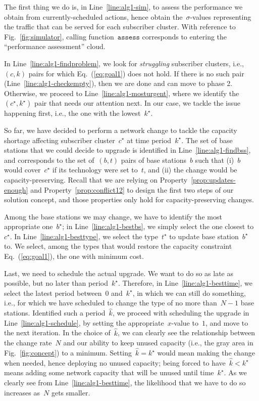 \documentclass[10pt,journal,cspaper,compsoc]{IEEEtran}
\newcommand{\Fig}[1]{Fig.~\ref{fig:#1}}
\newcommand{\Eq}[1]{Eq.~(\ref{eq:#1})}
\newcommand{\Line}[1]{Line~\ref{line:#1}}
\newcommand{\Prop}[1]{Property~\ref{prop:#1}}
\begin{document}
The first thing we do is, in \Line{alg1-sim}, to assess the performance we obtain from
currently-scheduled actions, hence obtain the~$\sigma$-values
representing the traffic that can be served for each subscriber cluster.
With reference to \Fig{simulator}, calling function~$\texttt{assess}$
corresponds to entering the ``performance assessment'' cloud.

In \Line{alg1-findproblem}, we look for {\em struggling} subscriber clusters, i.e.,~$(c,k)$ pairs
for which \Eq{goal1} does not hold. If there is no such pair
(\Line{alg1-checkempty}), then we are done and can move to phase 2. Otherwise, we proceed to \Line{alg1-mosturgent}, where we
identify the~$(c^\star,k^\star)$ pair that needs our attention next. In our case, we tackle the issue happening first, i.e., the one
with the lowest~$k^\star$.

So far, we have decided to perform a network change to tackle the capacity shortage affecting subscriber cluster~$c^\star$
at time period~$k^\star$. The set of base stations that we could decide to upgrade is identified in \Line{alg1-findbss},
and corresponds to the set of~$(b,t)$ pairs of base stations~$b$ such that
(i)~$b$ would cover~$c^\star$ if its technology were set to~$t$, and (ii) the change would be capacity-preserving.
Recall that we are relying on \Prop{updates-enough} and \Prop{conflict12} to design the first two steps of our solution concept,
and those properties only hold for capacity-preserving changes.

Among the base stations we may change, we have to identify the most appropriate one~$b^\star$; in
\Line{alg1-bestbs}, we simply select the one closest to~$c^\star$.
In \Line{alg1-besttype}, we select the type~$t^\star$ to update base station~$b^\star$ to. We select, among the types that
would restore the capacity constraint \Eq{goal1}, the one with minimum cost.

Last, we need to schedule the actual upgrade. We want to do so as late as possible, but no later than period~$k^\star$.
Therefore, in \Line{alg1-besttime}, we select the latest period between~$0$ and~$k^\star$, in which we can still do something, i.e.,
for which we have scheduled to change the type of no more than~$N-1$ base stations. Identified such a period~$\hat{k}$, we proceed with
scheduling the upgrade in \Line{alg1-schedule},
by setting the appropriate~$x$-value to~$1$, and move to the next iteration.
In the choice of~$\hat{k}$,
we can clearly see the relationship between the change rate~$N$ and our ability to keep unused capacity (i.e., the gray area
in \Fig{concept}) to a minimum. Setting~$\hat{k}=k^\star$ would mean making the change when needed, hence deploying no unused capacity;
being forced to have~$\hat{k}<k^\star$ means adding some network capacity that will be unused until time~$k^\star$.
As we clearly see from \Line{alg1-besttime}, the likelihood that we have to do so increases as~$N$ gets smaller.
\end{document}
